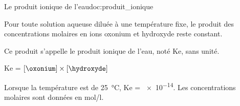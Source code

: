 \begin{doc}{Le produit ionique de l'eau}{doc:produit_ionique}
  \begin{encart}  
    Pour toute solution aqueuse diluée à une température fixe, le produit des concentrations molaires en ions oxonium \oxonium et hydroxyde \hydroxyde reste constant.
  \end{encart}
  
  Ce produit s’appelle le produit ionique de l’eau, noté Ke, sans unité.  
  \begin{center}
    Ke = $\left[ \oxonium \right] \times \left[ \hydroxyde \right]$
  \end{center}
  Lorsque la température est de \qty{25}{\degreeCelsius}, Ke = \num{e-14}.
  Les concentrations molaires sont données en \unit{\mole/\litre}.
\end{doc}


\newpage
{}



